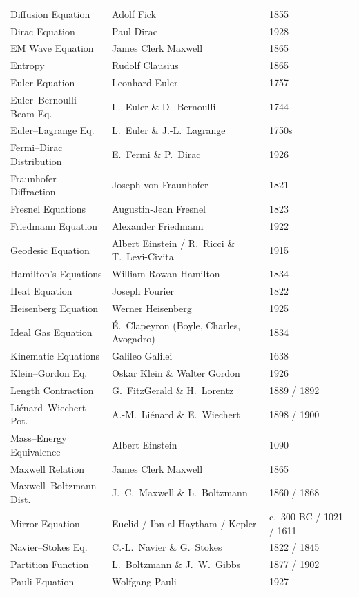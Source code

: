 \begin{longtable}{p{5.5cm}p{4.5cm}p{2cm}}
Diffusion Equation & Adolf Fick & 1855 \\
Dirac Equation & Paul Dirac & 1928 \\
EM Wave Equation & James Clerk Maxwell & 1865 \\
Entropy & Rudolf Clausius & 1865 \\
Euler Equation & Leonhard Euler & 1757 \\
Euler--Bernoulli Beam Eq. & L.\ Euler \& D.\ Bernoulli & 1744 \\
Euler--Lagrange Eq. & L.\ Euler \& J.-L.\ Lagrange & 1750s \\
Fermi--Dirac Distribution & E.\ Fermi \& P.\ Dirac & 1926 \\
Fraunhofer Diffraction & Joseph von Fraunhofer & 1821 \\
Fresnel Equations & Augustin-Jean Fresnel & 1823 \\
Friedmann Equation & Alexander Friedmann & 1922 \\
Geodesic Equation & Albert Einstein / R.\ Ricci \& T.\ Levi-Civita & 1915 \\
Hamilton's Equations & William Rowan Hamilton & 1834 \\
Heat Equation & Joseph Fourier & 1822 \\
Heisenberg Equation & Werner Heisenberg & 1925 \\
Ideal Gas Equation & \'E.\ Clapeyron (Boyle, Charles, Avogadro) & 1834 \\
Kinematic Equations & Galileo Galilei & 1638 \\
Klein--Gordon Eq. & Oskar Klein \& Walter Gordon & 1926 \\
Length Contraction & G.\ FitzGerald \& H.\ Lorentz & 1889 / 1892 \\
Li\'enard--Wiechert Pot. & A.-M.\ Li\'enard \& E.\ Wiechert & 1898 / 1900 \\
Mass--Energy Equivalence & Albert Einstein & 1090 \\
Maxwell Relation & James Clerk Maxwell & 1865 \\
Maxwell--Boltzmann Dist. & J.\ C.\ Maxwell \& L.\ Boltzmann & 1860 / 1868 \\
Mirror Equation & Euclid / Ibn al-Haytham / Kepler & c.\ 300 BC / 1021 / 1611 \\
Navier--Stokes Eq. & C.-L.\ Navier \& G.\ Stokes & 1822 / 1845 \\
Partition Function & L.\ Boltzmann \& J.\ W.\ Gibbs & 1877 / 1902 \\
Pauli Equation & Wolfgang Pauli & 1927 \\

\end{longtable}
